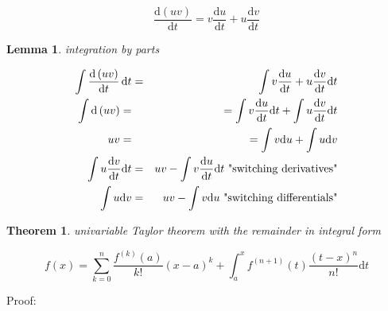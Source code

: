 \documentclass[
]{book}
\newtheorem{theorem}{Theorem}[chapter]
\newtheorem{lemma}{Lemma}[chapter]
\theoremstyle{definition}
\theoremstyle{definition}
\theoremstyle{definition}
\theoremstyle{definition}
\theoremstyle{remark}
\begin{document}
\[
\frac{\mathrm{d}\left(uv\right)}{\mathrm{d}t}=v\frac{\mathrm{d}u}{\mathrm{d}t}+u\frac{\mathrm{d}v}{\mathrm{d}t}
\]

\begin{lemma}
\protect\hypertarget{lem:unnamed-chunk-3}{}\label{lem:unnamed-chunk-3}integration by parts
\end{lemma}

\begin{eqnarray}
\int\frac{\mathrm{d}\left(uv\right)}{\mathrm{d}t}\thinspace\mathrm{d}t & = & \int v\frac{\mathrm{d}u}{\mathrm{d}t}+u\frac{\mathrm{d}v}{\mathrm{d}t}\mathrm{d}t\nonumber \\
\int\mathrm{d}\left(uv\right)= &  & =\int v\frac{\mathrm{d}u}{\mathrm{d}t}\mathrm{d}t+\int u\frac{\mathrm{d}v}{\mathrm{d}t}\mathrm{d}t\nonumber \\
uv= &  & =\int v\mathrm{d}u+\int u\mathrm{d}v\nonumber \\
\int u\frac{\mathrm{d}v}{\mathrm{d}t}\mathrm{d}t & = & uv-\int v\frac{\mathrm{d}u}{\mathrm{d}t}\mathrm{d}t\textrm{ "switching derivatives"}\label{eq:switchingDerivatives}\\
\int u\mathrm{d}v & = & uv-\int v\mathrm{d}u\textrm{ "switching differentials"}\label{eq:switchingDifferentials}
\end{eqnarray}

\begin{theorem}
\protect\hypertarget{thm:unnamed-chunk-4}{}\label{thm:unnamed-chunk-4}univariable Taylor theorem with the remainder in integral form
\end{theorem}

\[
f\left(x\right)=\sum\limits _{k=0}^{n}\frac{f^{\left(k\right)}\left(a\right)}{k!}\left(x-a\right)^{k}+\int_{a}^{x}f^{\left(n+1\right)}\left(t\right)\frac{\left(t-x\right)^{n}}{n!}\mathrm{d}t
\]

Proof:
\end{document}
